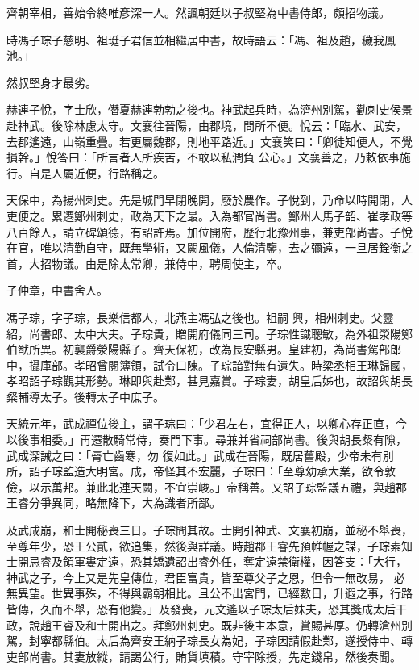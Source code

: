\begin{pinyinscope}
 齊朝宰相，善始令終唯彥深一人。然諷朝廷以子叔堅為中書侍郎，頗招物議。



 時馮子琮子慈明、祖珽子君信並相繼居中書，故時語云：「馮、祖及趙，穢我鳳池。」



 然叔堅身才最劣。



 赫連子悅，字士欣，僭夏赫連勃勃之後也。神武起兵時，為濟州別駕，勸刺史侯景赴神武。後除林慮太守。文襄往晉陽，由郡境，問所不便。悅云：「臨水、武安，去郡遙遠，山嶺重疊。若更屬魏郡，則地平路近。」文襄笑曰：「卿徒知便人，不覺損幹。」悅答曰：「所言者人所疾苦，不敢以私潤負
 公心。」文襄善之，乃敕依事施行。自是人屬近便，行路稱之。



 天保中，為揚州刺史。先是城門早閉晚開，廢於農作。子悅到，乃命以時開閉，人吏便之。累遷鄭州刺史，政為天下之最。入為都官尚書。鄭州人馬子韶、崔孝政等八百餘人，請立碑頌德，有詔許焉。加位開府，歷行北豫州事，兼吏部尚書。子悅在官，唯以清勤自守，既無學術，又闕風儀，人倫清鑒，去之彌遠，一旦居銓衡之首，大招物議。由是除太常卿，兼侍中，聘周使主，卒。



 子仲章，中書舍人。



 馮子琮，字子琮，長樂信都人，北燕主馮弘之後也。祖嗣
 興，相州刺史。父靈紹，尚書郎、太中大夫。子琮貴，贈開府儀同三司。子琮性識聰敏，為外祖滎陽鄭伯猷所異。初襲爵滎陽縣子。齊天保初，改為長安縣男。皇建初，為尚書駕部郎中，攝庫部。孝昭曾閱簿領，試令口陳。子琮諳對無有遺失。時梁丞相王琳歸國，孝昭詔子琮觀其形勢。琳即與赴鄴，甚見嘉賞。子琮妻，胡皇后姊也，故詔與胡長粲輔導太子。後轉太子中庶子。



 天統元年，武成禪位後主，謂子琮曰：「少君左右，宜得正人，以卿心存正直，今以後事相委。」再遷散騎常侍，奏門下事。尋兼并省祠部尚書。後與胡長粲有隙，武成深誡之曰：「脣亡齒寒，勿
 復如此。」武成在晉陽，既居舊殿，少帝未有別所，詔子琮監造大明宮。成，帝怪其不宏麗，子琮曰：「至尊幼承大業，欲令敦儉，以示萬邦。兼此北連天闕，不宜崇峻。」帝稱善。又詔子琮監議五禮，與趙郡王睿分爭異同，略無降下，大為識者所鄙。



 及武成崩，和士開秘喪三日。子琮問其故。士開引神武、文襄初崩，並秘不舉喪，至尊年少，恐王公貳，欲追集，然後與詳議。時趙郡王睿先預帷幄之謀，子琮素知士開忌睿及領軍婁定遠，恐其矯遺詔出睿外任，奪定遠禁衛權，因答支：「大行，神武之子，今上又是先皇傳位，君臣富貴，皆至尊父子之恩，但令一無改易，
 必無異望。世異事殊，不得與霸朝相比。且公不出宮門，已經數日，升遐之事，行路皆傳，久而不舉，恐有他變。」及發喪，元文遙以子琮太后妹夫，恐其獎成太后干政，說趙王睿及和士開出之。拜鄭州刺史。既非後主本意，賞賜甚厚。仍轉滄州別駕，封寧都縣伯。太后為齊安王納子琮長女為妃，子琮因請假赴鄴，遂授侍中、轉吏部尚書。其妻放縱，請謁公行，賄貨填積。守宰除授，先定錢帛，然後奏聞。




\end{pinyinscope}
